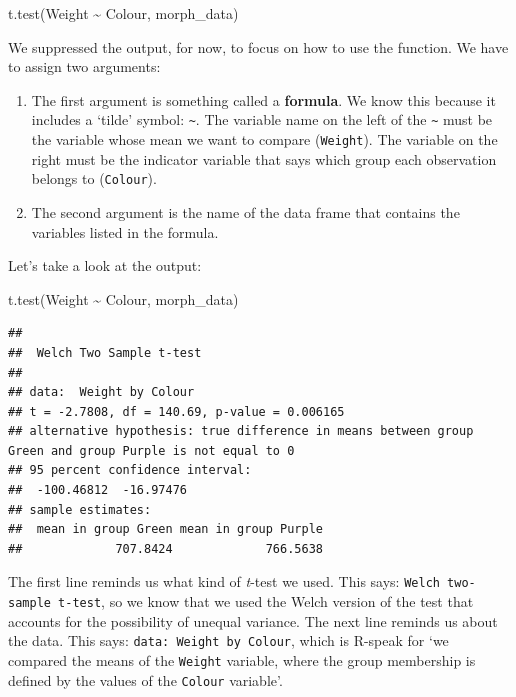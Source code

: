\documentclass[
]{book}
\newenvironment{Shaded}{\begin{snugshade}}{\end{snugshade}}
\newcommand{\FunctionTok}[1]{\textcolor[rgb]{0.00,0.00,0.00}{#1}}
\newcommand{\NormalTok}[1]{#1}
\newcommand{\SpecialCharTok}[1]{\textcolor[rgb]{0.00,0.00,0.00}{#1}}
\begin{document}
\begin{Shaded}
\begin{Highlighting}[]
\FunctionTok{t.test}\NormalTok{(Weight }\SpecialCharTok{\textasciitilde{}}\NormalTok{ Colour,  morph\_data)}
\end{Highlighting}
\end{Shaded}

We suppressed the output, for now, to focus on how to use the function. We have to assign two arguments:

\begin{enumerate}
\def\labelenumi{\arabic{enumi}.}
\item
  The first argument is something called a \textbf{formula}. We know this because it includes a `tilde' symbol: \texttt{\textasciitilde{}}. The variable name on the left of the \texttt{\textasciitilde{}} must be the variable whose mean we want to compare (\texttt{Weight}). The variable on the right must be the indicator variable that says which group each observation belongs to (\texttt{Colour}).
\item
  The second argument is the name of the data frame that contains the variables listed in the formula.
\end{enumerate}

Let's take a look at the output:

\begin{Shaded}
\begin{Highlighting}[]
\FunctionTok{t.test}\NormalTok{(Weight }\SpecialCharTok{\textasciitilde{}}\NormalTok{ Colour,  morph\_data)}
\end{Highlighting}
\end{Shaded}

\begin{verbatim}
## 
##  Welch Two Sample t-test
## 
## data:  Weight by Colour
## t = -2.7808, df = 140.69, p-value = 0.006165
## alternative hypothesis: true difference in means between group Green and group Purple is not equal to 0
## 95 percent confidence interval:
##  -100.46812  -16.97476
## sample estimates:
##  mean in group Green mean in group Purple 
##             707.8424             766.5638
\end{verbatim}

The first line reminds us what kind of \emph{t}-test we used. This says: \texttt{Welch\ two-sample\ t-test}, so we know that we used the Welch version of the test that accounts for the possibility of unequal variance. The next line reminds us about the data. This says: \texttt{data:\ Weight\ by\ Colour}, which is R-speak for `we compared the means of the \texttt{Weight} variable, where the group membership is defined by the values of the \texttt{Colour} variable'.
\end{document}
